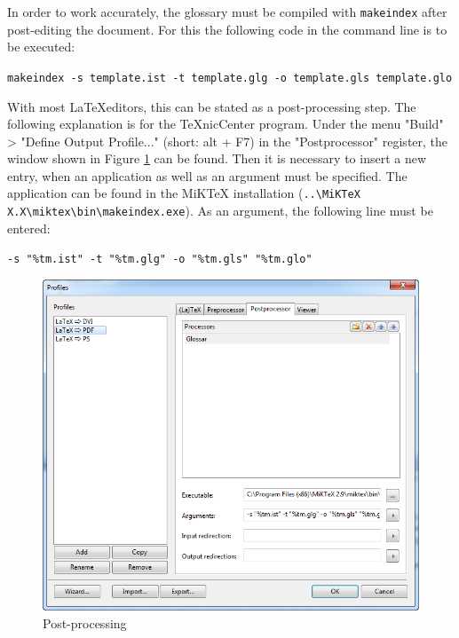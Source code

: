 In order to work accurately, the glossary must be compiled with \texttt{makeindex} after post-editing the document. For this the following code in the command line is to be executed:

\begin{center}
	\texttt{makeindex -s template.ist -t template.glg -o template.gls template.glo}
\end{center}

With most \LaTeX editors, this can be stated as a post-processing step. The following explanation is for the TeXnicCenter program. Under the menu "Build" > "Define Output Profile..." (short: alt + F7) in the "Postprocessor" register, the window shown in Figure \ref{fig:postprocessing} can be found. Then it is necessary to insert a new entry, when an application as well as an argument must be specified. The application can be found in the MiKTeX installation (\texttt{..\textbackslash MiKTeX X.X\textbackslash miktex\textbackslash bin\textbackslash makeindex.exe}). As an argument, the following line must be entered:

\begin{center}
	\texttt{-s \string"\%tm.ist\string" -t \string"\%tm.glg\string" -o \string"\%tm.gls\string" \string"\%tm.glo\string" }
\end{center}

\begin{figure}[H]
	\centering
		\includegraphics[scale=0.6]{images/profiles_glossar.png}
	\caption{Post-processing}
	\label{fig:postprocessing}
\end{figure}


